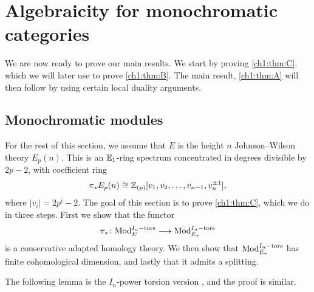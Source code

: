 
\section{Algebraicity for monochromatic categories}

We are now ready to prove our main results. We start by proving \cref{ch1:thm:C}, which we will later use to prove \cref{ch1:thm:B}. The main result, \cref{ch1:thm:A} will then follow by using certain local duality arguments. 

\subsection{Monochromatic modules}
\label{ch1:ssec:algebraicity-modules}

For the rest of this section, we assume that $E$ is the height $n$ Johnson--Wilson theory $E_p(n)$. This is an $\mathbb{E}_1$-ring spectrum concentrated in degrees divisible by $2p-2$, with coefficient ring 
\[\pi_* E_p(n) \cong \mathbb{Z}_{(p)}[v_1, v_2, \ldots, v_{n-1}, v_n^{\pm 1}],\] 
where $|v_i| = 2p^i-2$. The goal of this section is to prove \cref{ch1:thm:C}, which we do in three steps. First we show that the functor 
\[\pi_*\colon \mathrm{Mod}_{E}^{I_n-\mathrm{tors}} \longrightarrow \mathrm{Mod}_{E_*}^{I_n-\mathrm{tors}}\] 
is a conservative adapted homology theory. We then show that $\mathrm{Mod}_{E_*}^{I_n-\mathrm{tors}}$ has finite cohomological dimension, and lastly that it admits a splitting. 

The following lemma is the $I_n$-power torsion version \cite[3.14]{barthel-frankland_15}, and the proof is similar.

